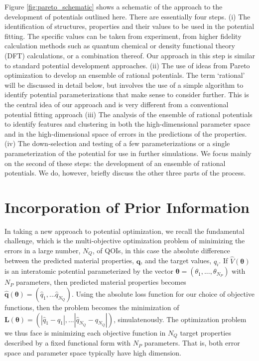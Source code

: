 Figure \ref{fig:pareto_schematic} shows a schematic of the approach to the development of potentials outlined here. There are essentially four steps.
(i) The identification of structures, properties and their values to be used in the potential fitting. The specific values can be taken from experiment, from higher fidelity calculation methods such as quantum chemical or density functional theory (DFT) calculations, or a combination thereof. Our approach in this step is similar to standard potential development approaches.
 (ii) The use of ideas from Pareto optimization to develop an ensemble of rational potentials. The term ‘rational’ will be discussed in detail below, but involves the use of a simple algorithm to identify potential parameterizations that make sense to consider further. This is the central idea of our approach and is very different from a conventional potential fitting approach
(iii) The analysis of the ensemble of rational potentials to identify features and clustering in both the high-dimensional parameter space and in the high-dimensional space of errors in the predictions of the properties.
(iv) The down-selection and testing of a few parameterizations or a single parameterization of the potential for use in further simulations.
We focus mainly on the second of these steps: the development of an ensemble of rational potentials. We do, however, briefly discuss the other three parts of the process.


\section{Incorporation of Prior Information}

In taking a new approach to potential optimization, we recall the fundamental challenge, which is the multi-objective optimization problem of minimizing the errors in a large number, $N_Q$, of QOIs, in this case the absolute difference between the predicted material properties, $\bm{q}$, and the target values, $q_i$.  If  $\hat{V}(\bm{\theta})$ is an interatomic potential parameterized by the vector $\bm{\theta} = (\theta_1,...,\theta_{N_P})$ with $N_P$ parameters, then predicted material properties becomes $\hat{\bm{q}}(\bm{\theta}) = (\hat{q}_1,...\hat{q}_{N_Q})$.  Using the absolute loss function for our choice of objective functions, then the problem becomes the minimization of  $\bm{L}(\bm{\theta}) = (|\hat{q}_1-q_1|,...|\hat{q}_{N_Q}-q_{N_Q}|)$, simulatenously.  The optimization problem we thus face is minimizing each objective function in $N_Q$ target properties described by a fixed functional form with $N_P$ parameters.  That is, both error space and parameter space typically have high dimension.


